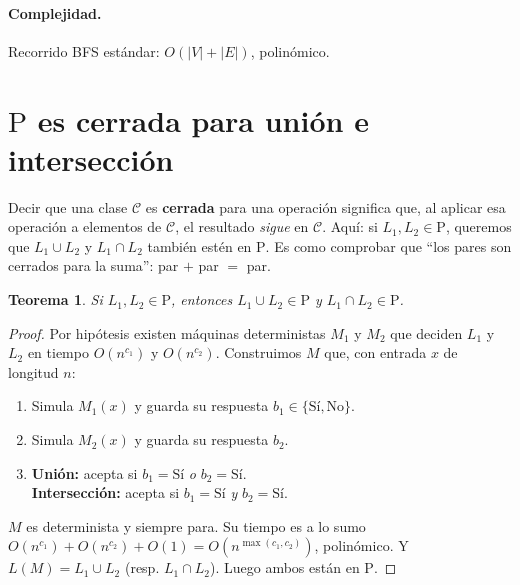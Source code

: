 \documentclass[11pt,a4paper]{article}
\theoremstyle{plain}
\newtheorem{teorema}{Teorema}
\theoremstyle{definition}
\newcommand{\Pclass}{\mathrm{P}}
\begin{document}
\paragraph{Complejidad.} Recorrido BFS est\'andar: $O(|V|+|E|)$, polin\'omico.

\section{$\Pclass$ es cerrada para uni\'on e intersecci\'on}

\begin{concepto}
Decir que una clase $\mathcal{C}$ es \textbf{cerrada} para una operaci\'on significa
que, al aplicar esa operaci\'on a elementos de $\mathcal{C}$, el resultado
\emph{sigue} en $\mathcal{C}$. Aqu\'i: si $L_1,L_2\in\Pclass$, queremos que
$L_1\cup L_2$ y $L_1\cap L_2$ tambi\'en est\'en en $\Pclass$. Es como comprobar que
``los pares son cerrados para la suma'': par $+$ par $=$ par.
\end{concepto}

\begin{teorema}
Si $L_1,L_2\in\Pclass$, entonces $L_1\cup L_2\in\Pclass$ y
$L_1\cap L_2\in\Pclass$.
\end{teorema}

\begin{proof}
Por hip\'otesis existen m\'aquinas deterministas $M_1$ y $M_2$ que deciden $L_1$ y
$L_2$ en tiempo $O(n^{c_1})$ y $O(n^{c_2})$. Construimos $M$ que, con entrada $x$ de
longitud $n$:
\begin{enumerate}[nosep]
  \item Simula $M_1(x)$ y guarda su respuesta $b_1\in\{\text{S\'i},\text{No}\}$.
  \item Simula $M_2(x)$ y guarda su respuesta $b_2$.
  \item \textbf{Uni\'on:} acepta si $b_1=\text{S\'i}$ \emph{o} $b_2=\text{S\'i}$.\\
        \textbf{Intersecci\'on:} acepta si $b_1=\text{S\'i}$ \emph{y}
        $b_2=\text{S\'i}$.
\end{enumerate}
$M$ es determinista y siempre para. Su tiempo es a lo sumo
$O(n^{c_1})+O(n^{c_2})+O(1)=O(n^{\max(c_1,c_2)})$, polin\'omico. Y
$L(M)=L_1\cup L_2$ (resp. $L_1\cap L_2$). Luego ambos est\'an en $\Pclass$.
\end{proof}
\end{document}
